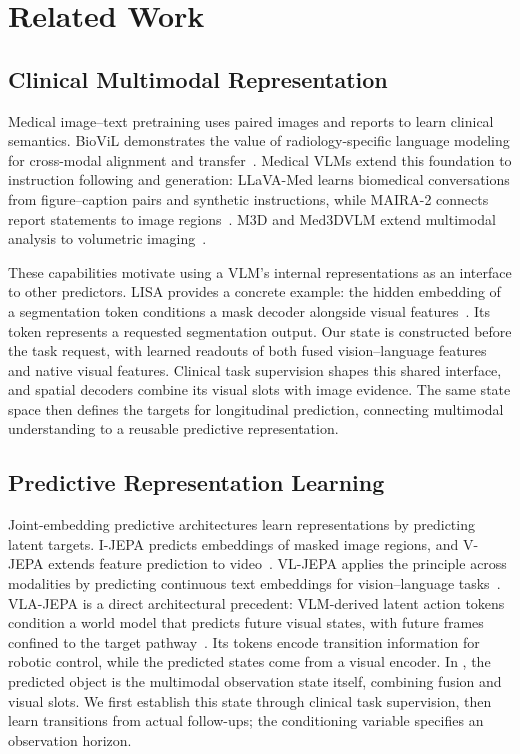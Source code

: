 \section{Related Work}
\label{sec:related}

\subsection{Clinical Multimodal Representation}
Medical image--text pretraining uses paired images and reports to learn clinical semantics. BioViL demonstrates the value of radiology-specific language modeling for cross-modal alignment and transfer~\citep{boecking2022biovil}. Medical VLMs extend this foundation to instruction following and generation: LLaVA-Med learns biomedical conversations from figure--caption pairs and synthetic instructions, while MAIRA-2 connects report statements to image regions~\citep{li2023llavamed,bannur2024maira2}. M3D and Med3DVLM extend multimodal analysis to volumetric imaging~\citep{bai2024m3d,xin2026med3dvlm}.

These capabilities motivate using a VLM's internal representations as an interface to other predictors. LISA provides a concrete example: the hidden embedding of a segmentation token conditions a mask decoder alongside visual features~\citep{lai2024lisa}. Its token represents a requested segmentation output. Our state is constructed before the task request, with learned readouts of both fused vision--language features and native visual features. Clinical task supervision shapes this shared interface, and spatial decoders combine its visual slots with image evidence. The same state space then defines the targets for longitudinal prediction, connecting multimodal understanding to a reusable predictive representation.

\subsection{Predictive Representation Learning}
Joint-embedding predictive architectures learn representations by predicting latent targets. I-JEPA predicts embeddings of masked image regions, and V-JEPA extends feature prediction to video~\citep{assran2023ijepa,bardes2024vjepa}. VL-JEPA applies the principle across modalities by predicting continuous text embeddings for vision--language tasks~\citep{chen2026vljepa}. VLA-JEPA is a direct architectural precedent: VLM-derived latent action tokens condition a world model that predicts future visual states, with future frames confined to the target pathway~\citep{sun2026vlajepa}. Its tokens encode transition information for robotic control, while the predicted states come from a visual encoder. In \method{}, the predicted object is the multimodal observation state itself, combining fusion and visual slots. We first establish this state through clinical task supervision, then learn transitions from actual follow-ups; the conditioning variable specifies an observation horizon.

